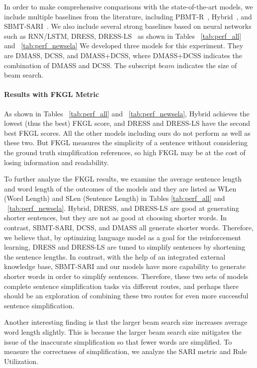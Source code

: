 \documentclass[11pt,a4paper]{article}
\begin{document}
In order to make comprehensive comparisons with the state-of-the-art models, we include multiple baselines from the literature, including PBMT-R~\cite{wubben2012sentence}, Hybrid~\cite{narayan2014hybrid}, and SBMT-SARI~\cite{xu2016optimizing}. We also include several strong baselines based on neural networks such as RNN/LSTM, DRESS, DRESS-LS~\cite{zhang2017sentence} as shown in Tables ~\ref{tab:perf_all} and ~\ref{tab:perf_newsela}
We developed three models for this experiment. They are DMASS, DCSS, and DMASS+DCSS, where DMASS+DCSS indicates the combination of DMASS and DCSS. The subscript $beam$ indicates the size of beam search. 


\paragraph{Results with FKGL Metric}

As shown in Tables ~\ref{tab:perf_all} and ~\ref{tab:perf_newsela}, Hybrid achieves the lowest (thus the best) FKGL score, and DRESS and DRESS-LS have the second best FKGL scores. All the other models including ours do not perform as well as these two. But FKGL measures the simplicity of a sentence without considering the ground truth simplification references, so high FKGL may be at the cost of losing information and readability.

To further analyze the FKGL results, we examine the average sentence length and word length of the outcomes of the models and they are listed as WLen (Word Length) and SLen (Sentence Length) in Tables \ref{tab:perf_all} and ~\ref{tab:perf_newsela}. Hybrid, DRESS, and DRESS-LS are good at generating shorter sentences, but they are not as good at choosing shorter words. In contrast, SBMT-SARI, DCSS, and DMASS all generate shorter words. Therefore, we believe that, by optimizing language model as a goal for the reinforcement learning, DRESS and DRESS-LS are tuned to simplify sentences by shortening the sentence lengths. 
In contrast, with the help of an integrated external knowledge base, SBMT-SARI and our models have more capability to generate shorter words in order to simplify sentences. Therefore, these two sets of models complete sentence simplification tasks via different routes, and perhaps there should be an exploration of combining these two routes for even more successful sentence simplification.

Another interesting finding is that the larger beam search size increases average word length slightly. This is because the larger beam search size mitigates the issue of the inaccurate simplification so that fewer words are simplified.
To measure the correctness of simplification, we analyze the SARI metric and Rule Utilization.
\end{document}
